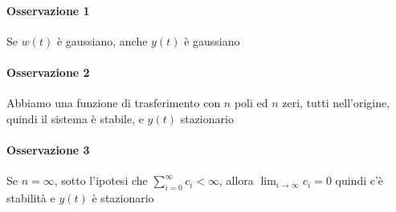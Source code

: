 \paragraph{Osservazione 1} Se $w(t)$ è gaussiano, anche $y(t)$ è gaussiano
\paragraph{Osservazione 2} Abbiamo una funzione di trasferimento con $n$ poli ed $n$ zeri, tutti nell'origine, quindi il sistema è stabile, e $y(t)$ stazionario
\paragraph{Osservazione 3} Se $n=\infty$, sotto l'ipotesi che $\sum_{i=0}^{\infty}{c_i}<\infty$, allora $\lim_{i\rightarrow\infty}{c_i}=0$ quindi c'è stabilità e $y(t)$ è stazionario


